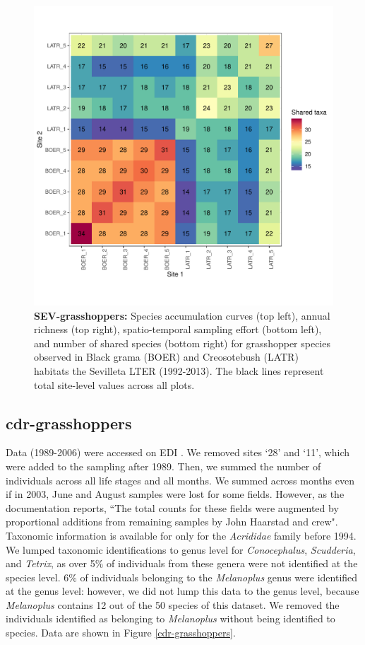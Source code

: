 \documentclass[11pt, oneside]{article}
\begin{document}
\begin{figure}[h!]
\includegraphics[scale = 0.4]{sev-grasshopper-compagnoni_spp_shared.pdf}
\caption{{\bf SEV-grasshoppers:} Species accumulation curves (top left),  annual richness (top right), spatio-temporal sampling effort (bottom left), and number of shared species (bottom right) for grasshopper species observed in Black grama (BOER) and Creosotebush (LATR) habitats the Sevilleta LTER (1992-2013). The black lines represent total site-level values across all plots.}
\label{sev-grasshoppers}
\end{figure}


\subsection{cdr-grasshoppers}
Data (1989-2006) were accessed on EDI \citep{cdr-grasshoppers}.
We removed sites `28' and `11', which were added to the sampling after 1989. 
Then, we summed the number of individuals across all life stages and all months. 
We summed across months even if in 2003, June and August samples were lost for some fields. 
However, as the documentation reports, ``The total counts for these fields were augmented by proportional additions from remaining samples by John Haarstad and crew".
Taxonomic information is available for only for the {\it Acrididae} family before 1994. 
We lumped taxonomic identifications to genus level for {\it Conocephalus}, {\it Scudderia}, and {\it Tetrix}, as over 5$\%$ of individuals from these genera were not identified at the species level. 
6$\%$ of individuals belonging to the {\it Melanoplus} genus were identified at the genus level: however, we did not lump this data to the genus level, because {\it Melanoplus} contains 12 out of the 50 species of this dataset. We removed the individuals identified as belonging to {\it Melanoplus} without being identified to species. 
Data are shown in Figure \ref{cdr-grasshoppers}.
\end{document}
